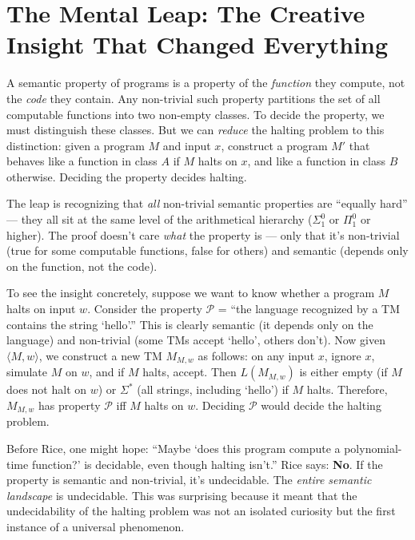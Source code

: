 \section{The Mental Leap: The Creative Insight That Changed Everything}
\label{sec:rice:leap}

A semantic property of programs is a property of the \emph{function} they compute, not the \emph{code} they contain. Any non-trivial such property partitions the set of all computable functions into two non-empty classes. To decide the property, we must distinguish these classes. But we can \emph{reduce} the halting problem to this distinction: given a program $M$ and input $x$, construct a program $M'$ that behaves like a function in class $A$ if $M$ halts on $x$, and like a function in class $B$ otherwise. Deciding the property decides halting.

The leap is recognizing that \emph{all} non-trivial semantic properties are ``equally hard'' --- they all sit at the same level of the arithmetical hierarchy ($\Sigma^0_1$ or $\Pi^0_1$ or higher). The proof doesn't care \emph{what} the property is --- only that it's non-trivial (true for some computable functions, false for others) and semantic (depends only on the function, not the code).

To see the insight concretely, suppose we want to know whether a program $M$ halts on input $w$. Consider the property $\mathcal{P}$ = ``the language recognized by a TM contains the string `hello'.'' This is clearly semantic (it depends only on the language) and non-trivial (some TMs accept `hello', others don't). Now given $\langle M, w \rangle$, we construct a new TM $M_{M,w}$ as follows: on any input $x$, ignore $x$, simulate $M$ on $w$, and if $M$ halts, accept. Then $L(M_{M,w})$ is either empty (if $M$ does not halt on $w$) or $\Sigma^*$ (all strings, including `hello') if $M$ halts. Therefore, $M_{M,w}$ has property $\mathcal{P}$ iff $M$ halts on $w$. Deciding $\mathcal{P}$ would decide the halting problem.

Before Rice, one might hope: ``Maybe `does this program compute a polynomial-time function?' is decidable, even though halting isn't.'' Rice says: \textbf{No}. If the property is semantic and non-trivial, it's undecidable. The \emph{entire semantic landscape} is undecidable. This was surprising because it meant that the undecidability of the halting problem was not an isolated curiosity but the first instance of a universal phenomenon.

